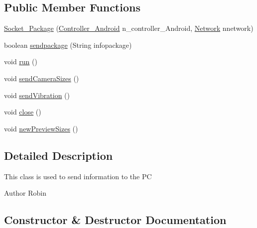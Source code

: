 \subsection*{Public Member Functions}
\begin{DoxyCompactItemize}
\item 
\hyperlink{classswp_1_1tuilmenau_1_1carduinodroid_1_1controller_1_1_socket___package_aa4bb757cfbf01a6dd21d114690131248}{Socket\+\_\+\+Package} (\hyperlink{classswp_1_1tuilmenau_1_1carduinodroid_1_1controller_1_1_controller___android}{Controller\+\_\+\+Android} n\+\_\+controller\+\_\+\+Android, \hyperlink{classswp_1_1tuilmenau_1_1carduinodroid_1_1controller_1_1_network}{Network} nnetwork)
\item 
boolean \hyperlink{classswp_1_1tuilmenau_1_1carduinodroid_1_1controller_1_1_socket___package_af1f59a4d10ed02a41fdbfbe189d51922}{sendpackage} (String infopackage)
\item 
void \hyperlink{classswp_1_1tuilmenau_1_1carduinodroid_1_1controller_1_1_socket___package_a5ac59e8b14090f0669452997e1d55a09}{run} ()
\item 
void \hyperlink{classswp_1_1tuilmenau_1_1carduinodroid_1_1controller_1_1_socket___package_a3e8a8bb73c0297f4589d74cb622689d4}{send\+Camera\+Sizes} ()
\item 
void \hyperlink{classswp_1_1tuilmenau_1_1carduinodroid_1_1controller_1_1_socket___package_ac94eadb1cae5fe5ed772c92c36ff81b6}{send\+Vibration} ()
\item 
void \hyperlink{classswp_1_1tuilmenau_1_1carduinodroid_1_1controller_1_1_socket___package_aa1379b7f52f3773259cf1c6fb08fb2a9}{close} ()
\item 
void \hyperlink{classswp_1_1tuilmenau_1_1carduinodroid_1_1controller_1_1_socket___package_a37c276fcdbfcbbe5f608531c255d3b00}{new\+Preview\+Sizes} ()
\end{DoxyCompactItemize}


\subsection{Detailed Description}
This class is used to send information to the P\+C

\begin{DoxyAuthor}{Author}
Robin 
\end{DoxyAuthor}


\subsection{Constructor \& Destructor Documentation}
\hypertarget{classswp_1_1tuilmenau_1_1carduinodroid_1_1controller_1_1_socket___package_aa4bb757cfbf01a6dd21d114690131248}{}
